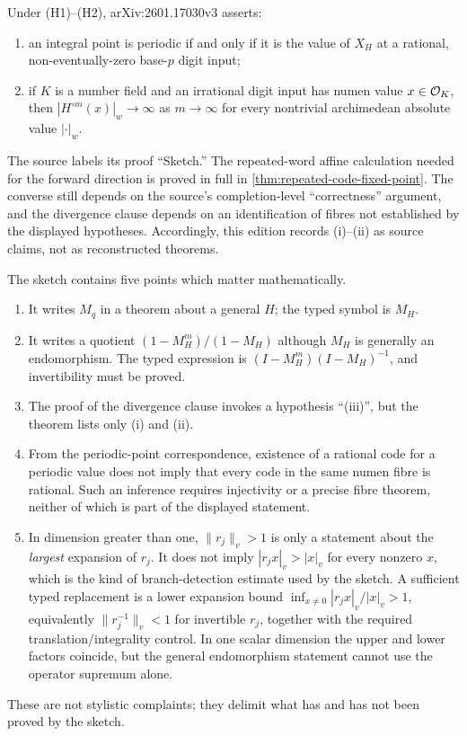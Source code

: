 \begin{status}
Under (H1)--(H2), arXiv:2601.17030v3 asserts:
\begin{enumerate}[label=\textup{(\roman*)}]
\item an integral point is periodic if and only if it is the value of $X_H$
      at a rational, non-eventually-zero base-$p$ digit input;
\item if $K$ is a number field and an irrational digit input has numen value
      $x\in\mathcal O_K$, then
      $|H^{\circ m}(x)|_w\to\infty$ as $m\to\infty$ for every nontrivial
      archimedean absolute value $|\cdot|_w$.
\end{enumerate}
The source labels its proof ``Sketch.''  The repeated-word affine calculation
needed for the forward direction is proved in full in
\cref{thm:repeated-code-fixed-point}.  The converse still depends on the
source's completion-level ``correctness'' argument, and the divergence clause
depends on an identification of fibres not established by the displayed
hypotheses.  Accordingly, this edition records (i)--(ii) as source claims,
not as reconstructed theorems.
\end{status}

\begin{sourceissue}
The sketch contains five points which matter mathematically.
\begin{enumerate}[label=\textup{(\alph*)}]
\item It writes $M_q$ in a theorem about a general $H$; the typed symbol is
      $M_H$.
\item It writes a quotient $(1-M_H^m)/(1-M_H)$ although $M_H$ is generally
      an endomorphism.  The typed expression is
      $(I-M_H^m)(I-M_H)^{-1}$, and invertibility must be proved.
\item The proof of the divergence clause invokes a hypothesis ``(iii)'', but
      the theorem lists only (i) and (ii).
\item From the periodic-point correspondence, existence of a rational code
      for a periodic value does not imply that every code in the same numen
      fibre is rational.  Such an inference requires injectivity or a precise
      fibre theorem, neither of which is part of the displayed statement.
\item In dimension greater than one, $\|r_j\|_v>1$ is only a statement about
      the \emph{largest} expansion of $r_j$.  It does not imply
      $|r_jx|_v>|x|_v$ for every nonzero $x$, which is the kind of
      branch-detection estimate used by the sketch.  A sufficient typed
      replacement is a lower expansion bound
      $\inf_{x\ne0}|r_jx|_v/|x|_v>1$, equivalently
      $\|r_j^{-1}\|_v<1$ for invertible $r_j$, together with the required
      translation/integrality control.  In one scalar dimension the upper
      and lower factors coincide, but the general endomorphism statement
      cannot use the operator supremum alone.
\end{enumerate}
These are not stylistic complaints; they delimit what has and has not been
proved by the sketch.
\end{sourceissue}

